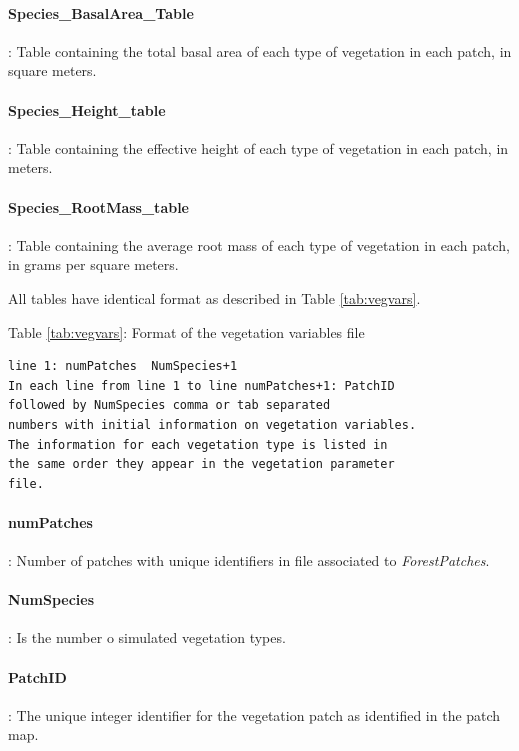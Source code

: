 \paragraph{Species\_BasalArea\_Table  }: Table containing the total basal area of each type of vegetation in each patch, in square meters.

\paragraph{Species\_Height\_table  }: Table containing the effective height of each type of vegetation in each patch, in meters.

\paragraph{Species\_RootMass\_table  }: Table containing the average root mass of each type of vegetation in each patch, in grams per square meters.

All tables have identical format as described in Table \ref{tab:vegvars}.

\begin{center}
Table \ref{tab:vegvars}: Format of the vegetation variables file
\begin{Frame}
\label{tab:vegvars}
\begin{verbatim}
line 1: numPatches	NumSpecies+1
In each line from line 1 to line numPatches+1: PatchID
followed by NumSpecies comma or tab separated
numbers with initial information on vegetation variables.
The information for each vegetation type is listed in 
the same order they appear in the vegetation parameter
file.
\end{verbatim}
\end{Frame}
\end{center} 

\paragraph{numPatches}: Number of patches with unique identifiers in file associated to \emph{ForestPatches}. 

\paragraph{NumSpecies}: Is the number o simulated vegetation types.

\paragraph{PatchID}: The unique integer identifier for the vegetation patch as identified in the patch map. \\

